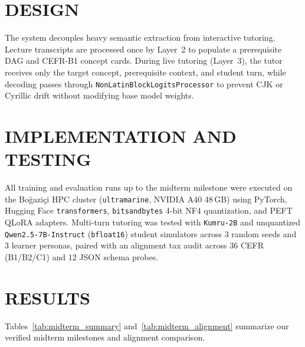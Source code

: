 \documentclass[a4paper,12pt]{report}
\begin{document}
\chapter{DESIGN}

The system decouples heavy semantic extraction from interactive tutoring. Lecture transcripts are processed once by Layer~2 to populate a prerequisite DAG and CEFR-B1 concept cards. During live tutoring (Layer~3), the tutor receives only the target concept, prerequisite context, and student turn, while decoding passes through \texttt{NonLatinBlockLogitsProcessor} to prevent CJK or Cyrillic drift without modifying base model weights.

\chapter{IMPLEMENTATION AND TESTING}

All training and evaluation runs up to the midterm milestone were executed on the Bo\u{g}azi\c{c}i HPC cluster (\texttt{ultramarine}, NVIDIA A40 48\,GB) using PyTorch, Hugging Face \texttt{transformers}, \texttt{bitsandbytes} 4-bit NF4 quantization, and PEFT QLoRA adapters. Multi-turn tutoring was tested with \texttt{Kumru-2B} and unquantized \texttt{Qwen2.5-7B-Instruct} (\texttt{bfloat16}) student simulators across $3$ random seeds and $3$ learner personas, paired with an alignment tax audit across $36$ CEFR (B1/B2/C1) and $12$ JSON schema probes.

\chapter{RESULTS}

Tables~\ref{tab:midterm_summary} and~\ref{tab:midterm_alignment} summarize our verified midterm milestones and alignment comparison.
\end{document}
